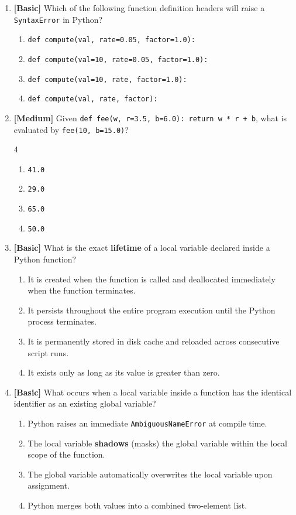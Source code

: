 \documentclass[11pt,a4paper]{article}
\begin{document}
\begin{enumerate}[label=\textbf{Q\arabic*.},leftmargin=1.8em,itemsep=0.7pt,topsep=0.3pt,resume]

\item \textbf{[Basic]} Which of the following function definition headers will raise a \texttt{SyntaxError} in Python?
\begin{enumerate}[label=\Alph*.,leftmargin=1.8em]
  \item \texttt{def compute(val, rate=0.05, factor=1.0):}
  \item \texttt{def compute(val=10, rate=0.05, factor=1.0):}
  \item \texttt{def compute(val=10, rate, factor=1.0):}
  \item \texttt{def compute(val, rate, factor):}
\end{enumerate}

\item \textbf{[Medium]} Given \texttt{def fee(w, r=3.5, b=6.0): return w * r + b}, what is evaluated by \texttt{fee(10, b=15.0)}?
\begin{multicols}{4}
\begin{enumerate}[label=\Alph*.]
  \item \texttt{41.0}
  \item \texttt{29.0}
  \item \texttt{65.0}
  \item \texttt{50.0}
\end{enumerate}
\end{multicols}

\item \textbf{[Basic]} What is the exact \textbf{lifetime} of a local variable declared inside a Python function?
\begin{enumerate}[label=\Alph*.,leftmargin=1.8em]
  \item It is created when the function is called and deallocated immediately when the function terminates.
  \item It persists throughout the entire program execution until the Python process terminates.
  \item It is permanently stored in disk cache and reloaded across consecutive script runs.
  \item It exists only as long as its value is greater than zero.
\end{enumerate}

\item \textbf{[Basic]} What occurs when a local variable inside a function has the identical identifier as an existing global variable?
\begin{enumerate}[label=\Alph*.,leftmargin=1.8em]
  \item Python raises an immediate \texttt{AmbiguousNameError} at compile time.
  \item The local variable \textbf{shadows} (masks) the global variable within the local scope of the function.
  \item The global variable automatically overwrites the local variable upon assignment.
  \item Python merges both values into a combined two-element list.
\end{enumerate}


\end{enumerate}
\end{document}
